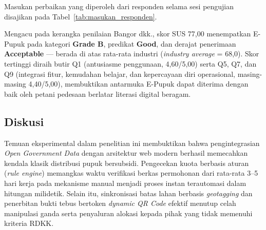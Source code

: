 ﻿\documentclass[conference]{IEEEtran}
\begin{document}
Masukan perbaikan yang diperoleh dari responden selama sesi pengujian disajikan pada Tabel~\ref{tab:masukan_responden}.

\begin{table}[htbp]
\caption{Masukan Perbaikan dari Responden Pengujian}
\begin{center}
\label{tab:masukan_responden}
\end{center}
\end{table}

Mengacu pada kerangka penilaian Bangor dkk., skor SUS 77,00 menempatkan E-Pupuk pada kategori \textbf{Grade B}, predikat \textbf{Good}, dan derajat penerimaan \textbf{Acceptable} --- berada di atas rata-rata industri (\textit{industry average} = 68,0). Skor tertinggi diraih butir Q1 (antusiasme penggunaan, 4,60/5,00) serta Q5, Q7, dan Q9 (integrasi fitur, kemudahan belajar, dan kepercayaan diri operasional, masing-masing 4,40/5,00), membuktikan antarmuka E-Pupuk dapat diterima dengan baik oleh petani pedesaan berlatar literasi digital beragam.

\subsection{Diskusi}
Temuan eksperimental dalam penelitian ini membuktikan bahwa pengintegrasian \textit{Open Government Data} dengan arsitektur web modern berhasil memecahkan kendala klasik distribusi pupuk bersubsidi. Pengecekan kuota berbasis aturan (\textit{rule engine}) memangkas waktu verifikasi berkas permohonan dari rata-rata 3--5 hari kerja pada mekanisme manual menjadi proses instan terautomasi dalam hitungan milidetik. Selain itu, sinkronisasi batas lahan berbasis \textit{geotagging} dan penerbitan bukti tebus bertoken \textit{dynamic QR Code} efektif menutup celah manipulasi ganda serta penyaluran alokasi kepada pihak yang tidak memenuhi kriteria RDKK.
\end{document}
